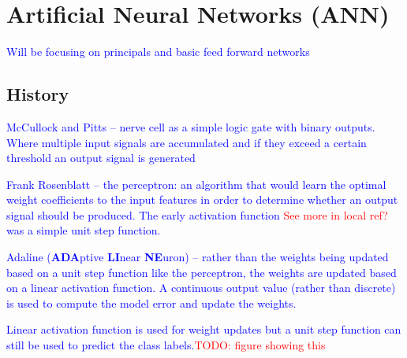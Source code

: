 \section{Artificial Neural Networks (ANN)}

\textcolor{blue}{Will be focusing on principals and basic feed forward networks}

\subsection{History}

\textcolor{blue}{McCullock and Pitts -- nerve cell as a simple logic gate with binary outputs.  Where multiple input signals are accumulated and if they exceed a certain threshold an output signal is generated}

\textcolor{blue}{Frank Rosenblatt -- the perceptron: an algorithm that would learn the optimal weight coefficients to the input features in order to determine whether an output signal should be produced. The early activation function \textcolor{red}{See more in local ref?} was a simple unit step function.}

\textcolor{blue}{Adaline (\textbf{ADA}ptive \textbf{LI}near \textbf{NE}uron) -- rather than the weights being updated based on a unit step function like the perceptron, the weights are updated based on a linear activation function. A continuous output value (rather than discrete) is used to compute the model error and update the weights.}

\textcolor{blue}{Linear activation function is used for weight updates but a unit step function can still be used to predict the class labels.\textcolor{red}{TODO: figure showing this}}